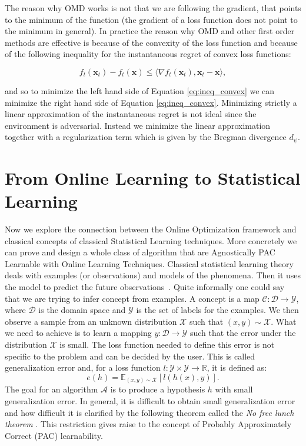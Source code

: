 The reason why OMD works is not that we are following the gradient, that points to the minimum of the function (the gradient of a loss function does not point to the minimum in general). In practice the reason why OMD and other first order methods are effective is because of the convexity of the loss function and because of the following inequality for the instantaneous regret of convex loss functions:

\begin{equation}\label{eq:ineq_convex}
f_t(\mathbf x_t)-f_t(\mathbf x)\le\langle\nabla f_t(\mathbf x_t),\mathbf x_t-\mathbf x\rangle,
\end{equation}

and so to minimize the left hand side of Equation \eqref{eq:ineq_convex} we can minimize the right hand side of Equation \eqref{eq:ineq_convex}. Minimizing strictly a linear approximation of the instantaneous regret is not ideal since the environment is adversarial. Instead we minimize the linear approximation together with a regularization term which is given by the Bregman divergence $d_\psi$.



\section{From Online Learning to Statistical Learning}\label{sec:stat_learning}
Now we explore the connection between the Online Optimization framework and classical concepts of classical Statistical Learning techniques. More concretely we can prove and design a whole class of algorithm that are Agnostically PAC Learnable with Online Learning Techniques.
Classical statistical learning theory deals with examples (or observations) and models of the phenomena. Then it uses the model to predict the future observations~\cite{bousquet2003introduction}. Quite informally one could say that we are trying to infer concept from examples. A concept is a map $\mathcal C:\mathcal D\to\mathcal Y$, where $\mathcal D$ is the domain space and $\mathcal Y$ is the set of labels for the examples. We then observe a sample from an unknown distribution $\mathcal X$ such that $(x,y)\sim \mathcal X$. What we need to achieve is to learn a mapping $y:\mathcal D\to\mathcal Y$ such that the error under the distribution $\mathcal X$ is small. The loss function needed to define this error is not specific to the problem and can be decided by the user. This is called generalization error and, for a loss function $l:\mathcal Y\times\mathcal Y \to\mathbb R$, it is defined as:
\begin{equation}\label{eq:generalization}
    e(h) = \mathbb E_{(x,y)\sim \mathcal X}[l(h(x),y)].
\end{equation}
The goal for an algorithm $\mathcal A$ is to produce a hypothesis $h$ with small generalization error. 
In general, it is difficult to obtain small generalization error and how difficult it is clarified by the following theorem called the \emph{No free lunch theorem} \cite{mitchell1997machine}.
This restriction gives raise to the concept of Probably Approximately Correct (PAC) learnability. 

